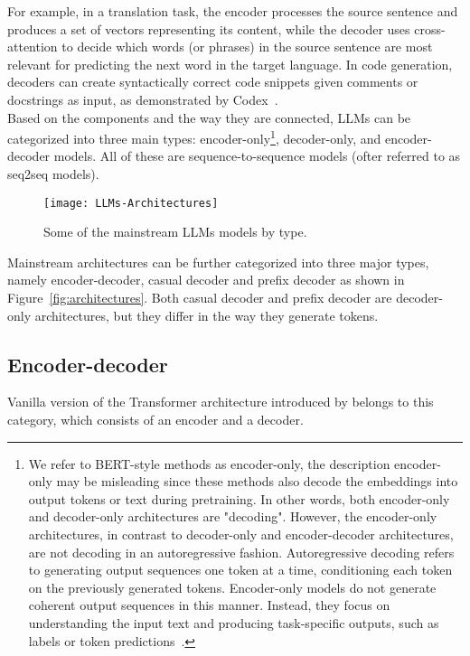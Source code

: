 For example, in a translation task, the encoder processes the source sentence and produces a set of vectors representing its content, while the decoder uses cross-attention to decide which words (or phrases) in the source sentence are most relevant for predicting the next word in the target language.
In code generation, decoders can create syntactically correct code snippets given comments or docstrings as input, as demonstrated by Codex~\cite{chen2021evaluating}.\\

Based on the components and the way they are connected, LLMs can be categorized into three main types: encoder-only\footnote{
	We refer to BERT-style methods as encoder-only, the description encoder-only may be misleading since these methods also decode the embeddings into output tokens or text during pretraining.
	In other words, both encoder-only and decoder-only architectures are "decoding". However, the encoder-only architectures, in contrast to decoder-only and encoder-decoder architectures, are not decoding in an autoregressive fashion.
	Autoregressive decoding refers to generating output sequences one token at a time, conditioning each token on the previously generated tokens.
	Encoder-only models do not generate coherent output sequences in this manner.
	Instead, they focus on understanding the input text and producing task-specific outputs, such as labels or token predictions~\cite{raschka2023encoderdecoder}.
},
decoder-only, and encoder-decoder models.
All of these are sequence-to-sequence models (ofter referred to as seq2seq models).

\begin{figure}[H]
	\centering
	\texttt{[image: LLMs-Architectures]}
	\caption{Some of the mainstream LLMs models by type.}
	\label{fig:llms-architectures}
\end{figure}

Mainstream architectures can be further categorized into three major types, namely encoder-decoder, casual decoder and prefix decoder as shown in Figure~\ref{fig:architectures}.
Both casual decoder and prefix decoder are decoder-only architectures, but they differ in the way they generate tokens.

\subsection{Encoder-decoder}
\label{subsec:encoder-decoder}

Vanilla version of the Transformer architecture introduced by \textcite{vaswani2023attention} belongs to this category, which consists of an encoder and a decoder.

